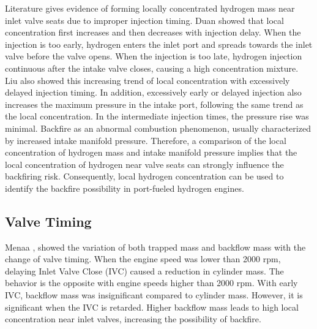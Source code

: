 \documentclass[conference]{IEEEtran}
\begin{document}
Literature gives evidence of forming locally concentrated hydrogen mass near inlet valve seats due to improper injection timing.
Duan \cite{b3} showed that local concentration first increases and then decreases with injection delay.
When the injection is too early, hydrogen enters the inlet port and spreads towards the inlet valve before the valve opens.
When the injection is too late, hydrogen injection continuous after the intake valve closes, causing a high concentration mixture.
Liu \cite{b4} also showed this increasing trend of local concentration with excessively delayed injection timing.
In addition, excessively early or delayed injection also increases the maximum pressure in the intake port, following the same trend as the local concentration.
In the intermediate injection times, the pressure rise was minimal.
Backfire as an abnormal combustion phenomenon, usually characterized by increased intake manifold pressure.
Therefore, a comparison of the local concentration of hydrogen mass and intake manifold pressure implies that the local concentration of hydrogen near valve seats can strongly influence the backfiring risk.
Consequently, local hydrogen concentration can be used to identify the backfire possibility in port-fueled hydrogen engines.\\

\subsection{Valve Timing}

Menaa \cite{b5}, showed the variation of both trapped mass and backflow mass with the change of valve timing.
When the engine speed was lower than 2000 rpm, delaying Inlet Valve Close (IVC) caused a reduction in cylinder mass.
The behavior is the opposite with engine speeds higher than 2000 rpm.
With early IVC, backflow mass was insignificant compared to cylinder mass.
However, it is significant when the IVC is retarded.
Higher backflow mass leads to high local concentration near inlet valves, increasing the possibility of backfire.\\
\end{document}

